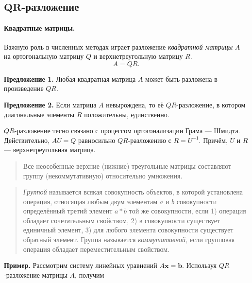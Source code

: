 \documentclass[11pt,a4paper]{article}
\begin{document}
    \hypertarget{mathbfqr-ux440ux430ux437ux43bux43eux436ux435ux43dux438ux435}{%
\subsection{\texorpdfstring{\(\mathbf{QR}\)-разложение}{\textbackslash mathbf\{QR\}-разложение}}\label{mathbfqr-ux440ux430ux437ux43bux43eux436ux435ux43dux438ux435}}

\hypertarget{ux43aux432ux430ux434ux440ux430ux442ux43dux44bux435-ux43cux430ux442ux440ux438ux446ux44b}{%
\paragraph{Квадратные матрицы.} \label{ux43aux432ux430ux434ux440ux430ux442ux43dux44bux435-ux43cux430ux442ux440ux438ux446ux44b}}

Важную роль в численных методах играет разложение \emph{квадратной
матрицы} \(A\) на ортогональную матрицу \(Q\) и верхнетреугольную
матрицу \(R\). \[
  A = QR.
\]

\textbf{Предложение 1.} Любая квадратная матрица \(A\) может быть
разложена в произведение \(QR\).

\textbf{Предложение 2.} Если матрица \(A\) невырождена, то её
\(QR\)-разложение, в котором диагональные элементы \(R\) положительны,
единственно.

\(QR\)-разложение тесно связано с процессом ортогонализации Грама ---
Шмидта. Действительно, \(AU = Q\) равносильно \(QR\)-разложению с
\(R = U^{-1}\). Причём, \(U\) и \(R\) --- верхнетреугольная матрица.

\begin{quote}
Все неособенные верхние (нижние) треугольные матрицы составляют группу
(некоммутативную) относительно умножения.
\end{quote}

\begin{quote}
\emph{Группой} называется всякая совокупность объектов, в которой
установлена операция, относящая любым двум элементам \(a\) и \(b\)
совокупности определённый третий элемент \(a \ast b\) той же
совокупности, если 1) операция обладает сочетательным свойством, 2) в
совокупности существует единичный элемент, 3) для любого элемента
совокупности существует обратный элемент. Группа называется
\emph{коммутативной}, если групповая операция обладает переместительным
свойством.
\end{quote}

\textbf{Пример.} Рассмотрим систему линейных уравнений
\(A\mathbf{x} = \mathbf{b}\). Используя \(QR\)-разложение матрицы \(A\),
получим
\end{document}
